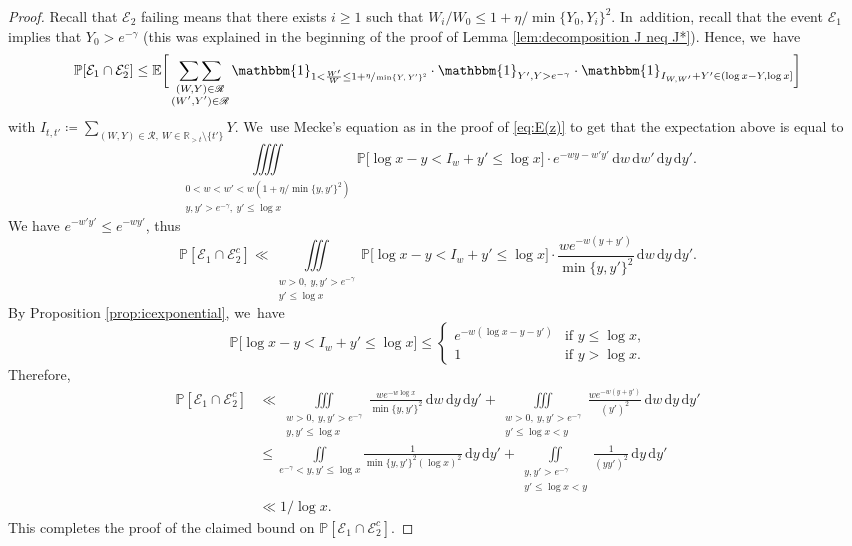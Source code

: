 \documentclass[10pt,a4paper]{amsart}
\newcommand{\RR}{\mathbb{R}}
\newcommand{\PP}{\mathbb{P}}
\newcommand{\EE}{\mathbb{E}}
\newcommand{\dee}{\,\mathrm{d}}
\newcommand{\one}{\mathbbm{1}}
\newcommand{\EC}{\mathcal{E}}
\newcommand{\RS}{\mathscr{R}}
\newcommand{\bg}{\big}
\newcommand{\bggg}{\bigg}
\theoremstyle{plain}
\theoremstyle{definition}
\begin{document}
\begin{proof} Recall that $\EC_2$ failing means that there exists $i\ge1$ such that $W_i/W_0\le 1+\eta/\min\{Y_0, Y_i\}^2$. In~addition, recall that the event $\EC_1$ implies that $Y_0 > e^{-\gamma}$ (this was explained in the beginning of the proof of Lemma \ref{lem:decomposition J neq J*}). Hence, we~have
\[
\PP[\EC_1 \cap \EC_2^c] \le
\EE\bggg[ \mathop{\sum\sum}_{\substack{(W,Y) \in \RS \\ (W',Y')\in\RS}} \one_{1< \frac{W'}{W} \le 1+\sfrac{\eta}{\min\{Y,Y'\}^2}}\cdot\one_{Y',Y>e^{-\gamma}} \cdot \one_{I_{W, W'} + Y'\in(\log x-Y,\log x]} \bggg]
\]
with $I_{t, t'} \coloneqq \sum_{(W, Y) \in \RS,\ W \in \RR_{>t}\setminus\{t'\}} Y$. We~use Mecke's equation as in the proof of \eqref{eq:E(z)} to get that the expectation above is equal to
\[
\iiiint\limits_{\substack{0 < w < w' < w(1+\eta/\min\{y,y'\}^2)\\ y, y' > e^{-\gamma},\ y'\le \log x}} \PP\bg[\log x - y<I_w + y' \le \log x\bg]\cdot e^{-wy-w'y'}
\dee w\dee w'\dee y\dee y'.
\]
We have $e^{-w'y'}\le e^{-wy'}$, thus
\[
\PP[\EC_1 \cap \EC_2^c] \ll
\iiint\limits_{\substack{w>0,\ y, y' > e^{-\gamma} \\ y'\le \log x}}
\PP\bg[\log x - y<I_w + y' \le \log x\bg]\cdot \frac{we^{-w(y+y')}}{\min\{y,y'\}^2} \dee w\dee y\dee y'.
\]
By Proposition \ref{prop:icexponential}, we~have
\[
\PP\bg[\log x - y<I_w + y' \le \log x\bg] \le \begin{cases}
e^{-w(\log x - y-y')}&\text{if $y \le \log x$,} \\
1 & \text{if $y > \log x$.}
\end{cases}
\]
Therefore,
\begin{align*}
\PP[\EC_1 \cap \EC_2^c]
&\ll \iiint\limits_{\substack{w>0,\ y, y' > e^{-\gamma} \\ y,y'\le \log x}}
\frac{we^{-w\log x}}{\min\{y,y'\}^2}\dee w\dee y\dee y'
+\iiint\limits_{\substack{w>0,\ y, y' > e^{-\gamma} \\ y'\le \log x<y}}
\frac{we^{-w(y+y')}}{(y')^2}\dee w\dee y\dee y' \\
&\le \iint\limits_{e^{-\gamma}<y, y'\le \log x}
\frac{1}{\min\{y,y'\}^2(\log x)^2}\dee y\dee y'
+\iint\limits_{\substack{y, y' > e^{-\gamma} \\ y'\le \log x<y}}
\frac{1}{(yy')^2} \dee y\dee y' \\
&\ll 1/\log x.
\end{align*}
This completes the proof of the claimed bound on $\PP[\EC_1\cap \EC_2^c]$.


\end{proof}
\end{document}
